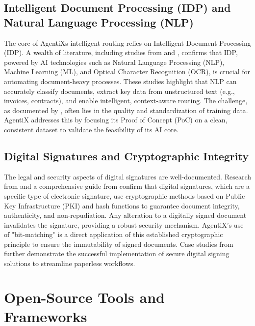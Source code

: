 \documentclass[12pt,oneside,openright,a4paper]{cpe-english-project}
\begin{document}
\vspace{1em}

\subsection{Intelligent Document Processing (IDP) and Natural Language
Processing (NLP)}

The core of AgentiX\textquotesingle s intelligent routing relies on
Intelligent Document Processing (IDP). A wealth of literature, including
studies from
 and
, confirms that IDP, powered by AI technologies such as Natural
Language Processing (NLP), Machine Learning (ML), and Optical Character
Recognition (OCR), is crucial for automating document-heavy processes.
These studies highlight that NLP can accurately classify documents,
extract key data from unstructured text (e.g., invoices, contracts), and
enable intelligent, context-aware routing. The challenge, as documented
by
, often lies in the quality and standardization of training
data. AgentiX addresses this by focusing its Proof of Concept (PoC) on a
clean, consistent dataset to validate the feasibility of its AI core.

\vspace{1em}

\subsection{Digital Signatures and Cryptographic Integrity}

The legal and security aspects of digital signatures are
well-documented. Research from
 and a comprehensive guide from
 confirm that digital signatures, which are a specific type of
electronic signature, use cryptographic methods based on Public Key
Infrastructure (PKI) and hash functions to guarantee document integrity,
authenticity, and non-repudiation. Any alteration to a digitally signed
document invalidates the signature, providing a robust security
mechanism. AgentiX's use of "bit-matching" is a direct application of
this established cryptographic principle to ensure the immutability of
signed documents. Case studies from
 further demonstrate the successful implementation of secure
digital signing solutions to streamline paperless workflows.

\vspace{1em}

\section{Open-Source Tools and Frameworks}
\end{document}
